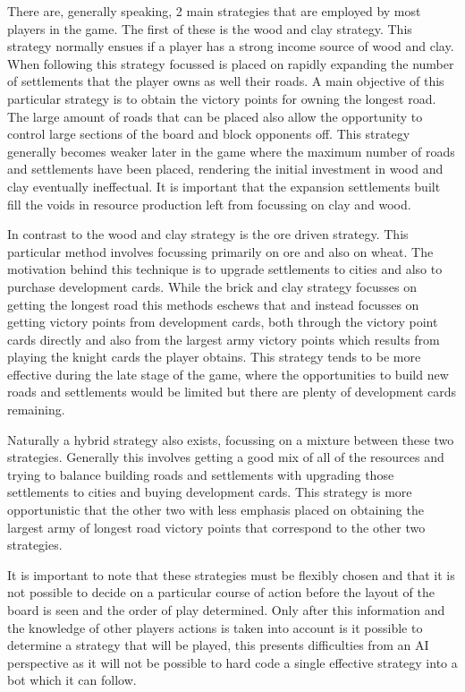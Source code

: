 \documentclass[]{article}
\begin{document}
\par There are, generally speaking, 2 main strategies that are employed by most players in the game. The first of these is the wood and clay strategy. This strategy normally ensues if a player has a strong income source of wood and clay. When following this strategy focussed is placed on rapidly expanding the number of settlements that the player owns as well their roads. A main objective of this particular strategy is to obtain the victory points for owning the longest road. The large amount of roads that can be placed also allow the opportunity to control large sections of the board and block opponents off. This strategy generally becomes weaker later in the game where the maximum number of roads and settlements have been placed, rendering the initial investment in wood and clay eventually ineffectual. It is important that the expansion settlements built fill the voids in resource production left from focussing on clay and wood.

\par In contrast to the wood and clay strategy is the ore driven strategy. This particular method involves focussing primarily on ore and also on wheat. The motivation behind this technique is to upgrade settlements to cities and also to purchase development cards. While the brick and clay strategy focusses on getting the longest road this methods eschews that and instead focusses on getting victory points from development cards, both through the victory point cards directly and also from the largest army victory points which results from playing the knight cards the player obtains. This strategy tends to be more effective during the late stage of the game, where the opportunities to build new roads and settlements would be limited but there are plenty of development cards remaining.

\par Naturally a hybrid strategy also exists, focussing on a mixture between these two strategies. Generally this involves getting a good mix of all of the resources and trying to balance building roads and settlements with upgrading those settlements to cities and buying development cards. This strategy is more opportunistic that the other two with less emphasis placed on obtaining the largest army of longest road victory points that correspond to the other two strategies. 

\par It is important to note that these strategies must be flexibly chosen and that it is not possible to decide on a particular course of action before the layout of the board is seen and the order of play determined. Only after this information and the knowledge of other players actions is taken into account is it possible to determine a strategy that will be played, this presents difficulties from an AI perspective as it will not be possible to hard code a single effective strategy into a bot which it can follow.
\end{document}
